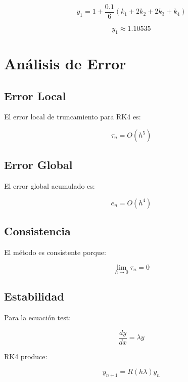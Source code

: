 \documentclass[12pt,a4paper]{article}
\begin{document}
\begin{equation}
y_1 = 1 + \frac{0.1}{6}(k_1 + 2k_2 + 2k_3 + k_4)
\end{equation}

\begin{equation}
y_1 \approx 1.10535
\end{equation}

\section{Análisis de Error}

\subsection{Error Local}

El error local de truncamiento para RK4 es:

\begin{equation}
\tau_n = O(h^5)
\end{equation}

\subsection{Error Global}

El error global acumulado es:

\begin{equation}
e_n = O(h^4)
\end{equation}

\subsection{Consistencia}

El método es consistente porque:

\begin{equation}
\lim_{h \to 0} \tau_n = 0
\end{equation}

\subsection{Estabilidad}

Para la ecuación test:

\begin{equation}
\frac{dy}{dx} = \lambda y
\end{equation}

RK4 produce:

\begin{equation}
y_{n+1} = R(h\lambda) y_n
\end{equation}
\end{document}
